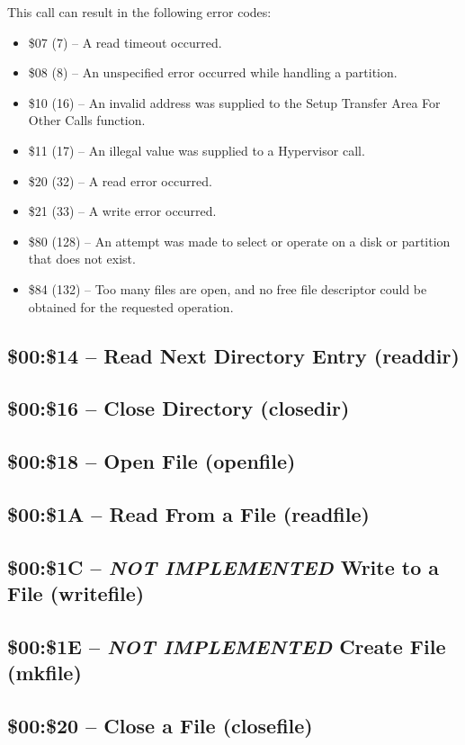 This call can result in the following error codes:

\begin{itemize}
\item \$07 (7) -- A read timeout occurred.
  \item \$08 (8) -- An unspecified error occurred while handling a partition.
\item \$10 (16) -- An invalid address was supplied to the Setup Transfer Area For Other Calls function.
\item \$11 (17) -- An illegal value was supplied to a Hypervisor call.
\item \$20 (32) -- A read error occurred.
\item \$21 (33) -- A write error occurred.
\item \$80 (128) -- An attempt was made to select or operate on a disk or partition that does not exist.
\item \$84 (132) -- Too many files are open, and no free file descriptor could be obtained for the requested operation.
\end{itemize}

\subsection{\$00:\$14 -- Read Next Directory Entry (readdir)}
\subsection{\$00:\$16 -- Close Directory (closedir)}
\subsection{\$00:\$18 -- Open File (openfile)}
\subsection{\$00:\$1A -- Read From a File (readfile)}
\subsection{\$00:\$1C -- {\em NOT IMPLEMENTED} Write to a File (writefile)}
\subsection{\$00:\$1E -- {\em NOT IMPLEMENTED} Create File (mkfile)}

\subsection{\$00:\$20 -- Close a File (closefile)}
